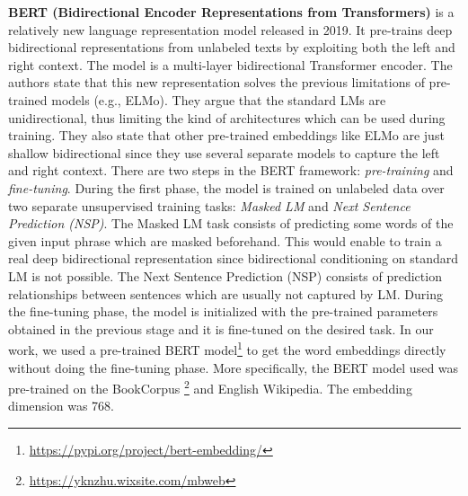 \documentclass[11pt,a4paper]{article}
\begin{document}
\textbf{BERT (Bidirectional Encoder Representations from Transformers)} \cite{devlin2018bert} is a relatively new language representation model released in 2019. It pre-trains deep bidirectional representations from unlabeled texts by exploiting both the left and right context. The model is a multi-layer bidirectional Transformer encoder. The authors state that this new representation solves the previous limitations of pre-trained models (e.g., ELMo). They argue that the standard LMs are unidirectional, thus limiting the kind of architectures which can be used during training. They also state that other pre-trained embeddings like ELMo are just shallow bidirectional since they use several separate models to capture the left and right context.
There are two steps in the BERT framework: \textit{pre-training} and \textit{fine-tuning}. During the first phase, the model is trained on unlabeled data over two separate unsupervised training tasks: \textit{Masked LM} and \textit{Next Sentence Prediction (NSP)}.  The Masked LM task consists of predicting some words of the given input phrase which are masked beforehand.  This would enable to train a real deep bidirectional representation since bidirectional conditioning on standard LM is not possible. The Next Sentence Prediction (NSP) consists of prediction relationships between sentences which are usually not captured by LM. 
During the fine-tuning phase, the model is initialized with the pre-trained parameters obtained in the previous stage and it is fine-tuned on the desired task. 
In our work, we used a pre-trained BERT model\footnote{\url{https://pypi.org/project/bert-embedding/}} to get the word embeddings directly without doing the fine-tuning phase. More specifically, the BERT model used was pre-trained on the BookCorpus \footnote{\url{https://yknzhu.wixsite.com/mbweb}} and English Wikipedia. The embedding dimension was 768.  
\end{document}
